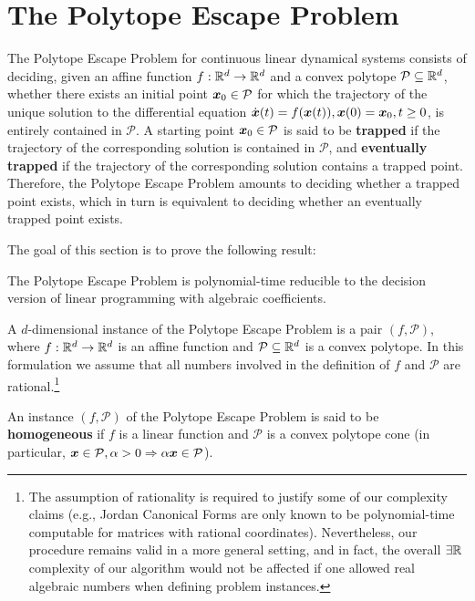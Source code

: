 \section{The Polytope Escape Problem}

The Polytope Escape Problem for continuous linear dynamical systems
consists of deciding, given an affine function
$f:\mathbb{R}^{d}\rightarrow \mathbb{R}^{d}$ and a convex polytope
$\mathcal{P}\subseteq\mathbb{R}^{d}$, whether there exists an initial point
$\boldsymbol{x}_{0} \in \mathcal{P}$ for which the trajectory of the unique
solution to the differential equation
$\dot{\boldsymbol{x}}(t)=f(\boldsymbol{x}(t)),\boldsymbol{x}(0)=\boldsymbol{x}_{0},
t\geq 0$,
is entirely contained in $\mathcal{P}$.  A starting point
$\boldsymbol{x}_{0}\in\mathcal{P}$ is said to be \textbf{trapped} if
the trajectory of the corresponding solution is contained in $\mathcal{P}$,
and \textbf{eventually trapped} if the trajectory of the corresponding
solution contains a trapped point. Therefore, the Polytope Escape
Problem amounts to deciding whether a trapped point exists, which in
turn is equivalent to deciding whether an eventually trapped point exists.

The goal of this section is to prove the following result:

\begin{theorem}
  The Polytope Escape Problem is polynomial-time reducible to the
  decision version of linear programming with algebraic coefficients.
\end{theorem}

A $d$-dimensional instance of the Polytope Escape Problem is a pair
$(f,\mathcal{P})$, where $f:\mathbb{R}^{d}\rightarrow \mathbb{R}^{d}$
is an affine function and $\mathcal{P}\subseteq\mathbb{R}^{d}$ is a
convex polytope. In this formulation we assume that all numbers
involved in the definition of $f$ and $\mathcal{P}$ are
rational.\footnote{The assumption of rationality is required to
  justify some of our complexity claims (e.g., Jordan Canonical Forms
  are only known to be polynomial-time computable for matrices with
  rational coordinates). Nevertheless, our procedure remains valid in
  a more general setting, and in fact, the overall
  $\exists \mathbb{R}$ complexity of our algorithm would not be
  affected if one allowed real algebraic numbers when defining problem
  instances.}

An instance $(f,\mathcal{P})$ of the Polytope Escape Problem is said
to be \textbf{homogeneous} if $f$ is a linear function and
$\mathcal{P}$ is a convex polytope cone (in particular,
$\boldsymbol{x}\in\mathcal{P},\alpha>0\Rightarrow \alpha\boldsymbol{x}
\in\mathcal{P}$).


